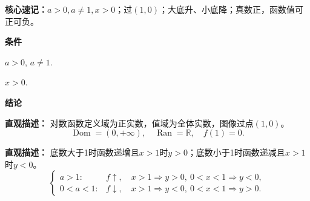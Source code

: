 \begin{statementbox}

\textbf{核心速记：}$a>0,a\ne1,x>0$；过$(1,0)$；大底升、小底降；真数正，函数值可正可负。


	\end{statementbox}
\clearpage
\begin{statementbox}
\textbf{\textcolor{CStatement}{条件}}
	\begin{description}[style=nextline, leftmargin=2.8em, labelsep=0.5em, itemsep=0.35em]
		\item[\textbf{\textcolor{CStatement}{条件1（底数要求）：}}] $a>0$, $a\neq 1$.
		\item[\textbf{\textcolor{CStatement}{条件2（定义域）：}}] $x>0$.
	\end{description}

	\textbf{\textcolor{CStatement}{结论}}
	\begin{description}[style=nextline, leftmargin=2.8em, labelsep=0.5em, itemsep=0.45em]
		\item[\textbf{\textcolor{CStatement}{结论一（性质总览）：}}]
			\textbf{\textcolor{CStatement}{直观描述：}}
			对数函数定义域为正实数，值域为全体实数，图像过点$(1,0)$。
			\[
				\operatorname{Dom}=(0,+\infty),\quad \operatorname{Ran}=\mathbb{R},\quad f(1)=0.
			\]

		\item[\textbf{\textcolor{CStatement}{结论二（单调与符号）：}}]
			\textbf{\textcolor{CStatement}{直观描述：}}
			底数大于1时函数递增且$x>1$时$y>0$；底数小于1时函数递减且$x>1$时$y<0$。
			\[
				\begin{cases}
					a>1: & f\uparrow,\quad x>1\Rightarrow y>0,\ 0<x<1\Rightarrow y<0,\\[2pt]
					0<a<1: & f\downarrow,\quad x>1\Rightarrow y<0,\ 0<x<1\Rightarrow y>0.
			\end{cases}
			\]
	\end{description}

	
\end{statementbox}
\clearpage

